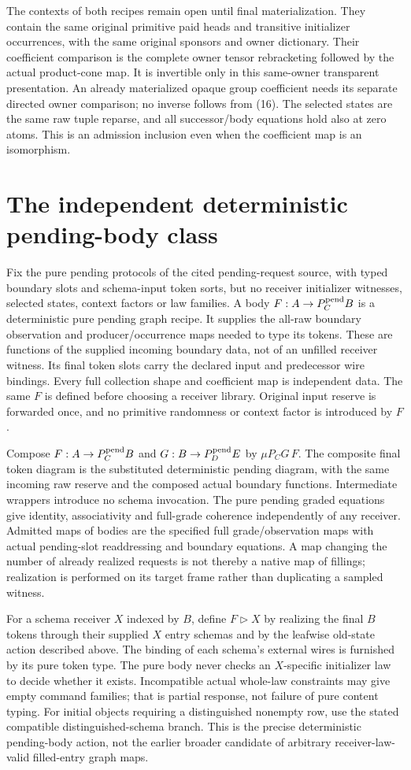 \documentclass[11pt]{article}
\begin{document}
The contexts of both recipes remain open until final materialization. They contain the same original primitive paid heads and transitive initializer occurrences, with the same original sponsors and owner dictionary. Their coefficient comparison is the complete owner tensor rebracketing followed by the actual product-cone map. It is invertible only in this same-owner transparent presentation. An already materialized opaque group coefficient needs its separate directed owner comparison; no inverse follows from (16). The selected states are the same raw tuple reparse, and all successor/body equations hold also at zero atoms. This is an admission inclusion even when the coefficient map is an isomorphism.

\section{The independent deterministic pending-body class}
Fix the pure pending protocols of the cited pending-request source, with typed boundary slots and schema-input token sorts, but no receiver initializer witnesses, selected states, context factors or law families. A body $F:A\to P_C^{\rm pend}B$ is a deterministic pure pending graph recipe. It supplies the all-raw boundary observation and producer/occurrence maps needed to type its tokens. These are functions of the supplied incoming boundary data, not of an unfilled receiver witness. Its final token slots carry the declared input and predecessor wire bindings. Every full collection shape and coefficient map is independent data. The same $F$ is defined before choosing a receiver library. Original input reserve is forwarded once, and no primitive randomness or context factor is introduced by $F$.

Compose $F:A\to P_C^{\rm pend}B$ and $G:B\to P_D^{\rm pend}E$ by $\mu P_CG\,F$. The composite final token diagram is the substituted deterministic pending diagram, with the same incoming raw reserve and the composed actual boundary functions. Intermediate wrappers introduce no schema invocation. The pure pending graded equations give identity, associativity and full-grade coherence independently of any receiver. Admitted maps of bodies are the specified full grade/observation maps with actual pending-slot readdressing and boundary equations. A map changing the number of already realized requests is not thereby a native map of fillings; realization is performed on its target frame rather than duplicating a sampled witness.

For a schema receiver $X$ indexed by $B$, define $F\triangleright X$ by realizing the final $B$ tokens through their supplied $X$ entry schemas and by the leafwise old-state action described above. The binding of each schema's external wires is furnished by its pure token type. The pure body never checks an $X$-specific initializer law to decide whether it exists. Incompatible actual whole-law constraints may give empty command families; that is partial response, not failure of pure content typing. For initial objects requiring a distinguished nonempty row, use the stated compatible distinguished-schema branch. This is the precise deterministic pending-body action, not the earlier broader candidate of arbitrary receiver-law-valid filled-entry graph maps.
\end{document}

